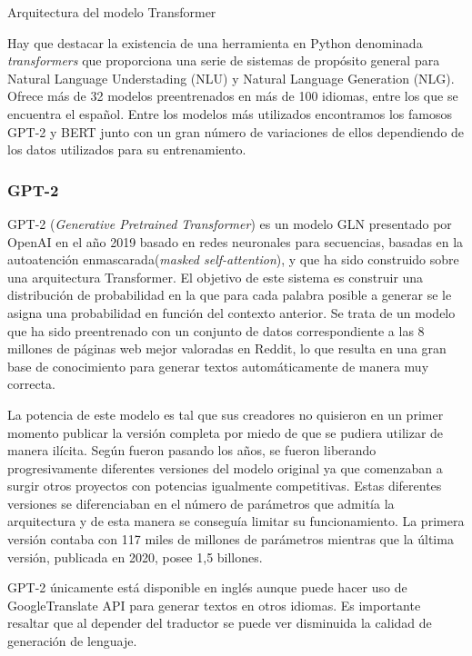 %
{Arquitectura del modelo Transformer}



Hay que destacar la existencia de una herramienta en Python denominada \textit{transformers} que proporciona una serie de sistemas de propósito general para Natural Language Understading (NLU) y Natural Language Generation (NLG). Ofrece más de 32 modelos preentrenados en más de 100 idiomas, entre los que se encuentra el español. Entre los modelos más utilizados encontramos los famosos GPT-2 y BERT junto con un gran número de variaciones de ellos dependiendo de los datos utilizados para su entrenamiento.

\subsubsection{GPT-2}

GPT-2 (\textit{Generative Pretrained Transformer}) es un modelo GLN presentado por OpenAI en el año 2019 basado en redes neuronales para secuencias, basadas en la autoatención enmascarada(\textit{masked self-attention}), y que ha sido construido sobre una arquitectura Transformer. El objetivo de este sistema es construir una distribución de probabilidad en la que para cada palabra posible a generar se le asigna una probabilidad en función del contexto anterior. Se trata de un modelo que ha sido preentrenado con un conjunto de datos correspondiente a las 8 millones de páginas web mejor valoradas en Reddit, lo que resulta en una gran base de conocimiento para generar textos automáticamente de manera muy correcta.

La potencia de este modelo es tal que sus creadores no quisieron en un primer momento publicar la versión completa por miedo de que se pudiera utilizar de manera ilícita. Según fueron pasando los años, se fueron liberando progresivamente diferentes versiones del modelo original ya que comenzaban a surgir otros proyectos con potencias igualmente competitivas. Estas diferentes versiones se diferenciaban en el número de parámetros que admitía la arquitectura y de esta manera se conseguía limitar su funcionamiento. La primera versión contaba con 117 miles de millones de parámetros mientras que la última versión, publicada en 2020, posee 1,5 billones.

GPT-2 únicamente está disponible en inglés aunque puede hacer uso de GoogleTranslate API para generar textos en otros idiomas. Es importante resaltar que al depender del traductor se puede ver disminuida la calidad de generación de lenguaje.

